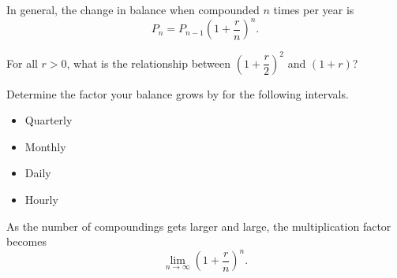 \documentclass{ximera}
\begin{document}
In general, the change in balance when compounded $n$ times per year is $$P_n = P_{n-1}\left(1+\dfrac{r}{n}\right)^n\text{.}$$

\begin{question}

For all $r > 0$, what is the relationship between $\left(1+\dfrac{r}{2}\right)^2$ and $(1 + r)$?

\begin{multipleChoice}
\end{multipleChoice}

Determine the factor your balance grows by for the following intervals.
\begin{itemize}
\item Quarterly
\begin{multipleChoice}
\end{multipleChoice}
\item Monthly
\begin{multipleChoice}
\end{multipleChoice}
\item Daily
\begin{multipleChoice}
\end{multipleChoice}
\item Hourly
\begin{multipleChoice}
\end{multipleChoice}
\end{itemize}
As the number of compoundings gets larger and large, the multiplication factor becomes $$\lim_{n \to \infty}\left(1 + \dfrac{r}{n}\right)^n \text{.}$$


\end{question}
\end{document}
